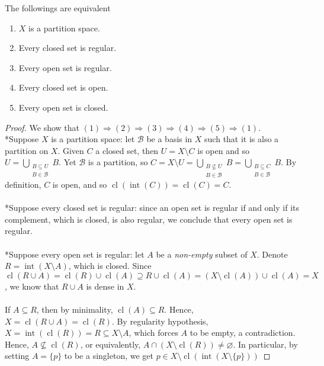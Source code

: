 \documentclass{treatise}
\begin{document}
\begin{theorem}
The followings are equivalent
\begin{enumerate}
    \item $X$ is a partition space.
    \item Every closed set is regular.
    \item Every open set is regular.
    \item Every closed set is open.
    \item Every open set is closed.
\end{enumerate}
\end{theorem}
\begin{proof}
We show that $(1) \Rightarrow (2) \Rightarrow (3) \Rightarrow (4) \Rightarrow (5) \Rightarrow (1)$.
\\
*Suppose $X$ is a partition space: let $\mathcal{B}$ be a basis in $X$ such that it is also a partition on $X$. Given $C$ a closed set, then $U = X \setminus C$ is open and so $U = \bigcup_{\substack{B \subseteq U \\ B \in \mathcal{B}}} B$. Yet $\mathcal{B}$ is a partition, so $C = X \setminus U = \bigcup_{\substack{B \not\subseteq U \\ B \in \mathcal{B}}} B = \bigcup_{\substack{B \subseteq C \\ B \in \mathcal{B}}} B$. By definition, $C$ is open, and so $\operatorname{cl}(\operatorname{int}(C)) = \operatorname{cl}(C) = C$.
\\
\\
*Suppose every closed set is regular: since an open set is regular if and only if its complement, which is closed, is also regular, we conclude that every open set is regular.
\\
\\
*Suppose every open set is regular: let $A$ be a \textit{non-empty} subset of $X$. Denote $R = \operatorname{int}(X \setminus A)$, which is closed. Since $\operatorname{cl}(R \cup A) = \operatorname{cl}(R) \cup \operatorname{cl}(A) \supseteq R \cup \operatorname{cl}(A) = (X \setminus \operatorname{cl}(A)) \cup \operatorname{cl}(A) = X$, we know that $R \cup A$ is dense in $X$.
\\
\\
If $A \subseteq R$, then by minimality, $\operatorname{cl}(A) \subseteq R$. Hence, $X = \operatorname{cl}(R \cup A) = \operatorname{cl}(R)$. By regularity hypothesis, $X = \operatorname{int}(\operatorname{cl}(R)) = R \subseteq X \setminus A$, which forces $A$ to be empty, a contradiction. Hence, $A \not\subseteq \operatorname{cl}(R)$, or equivalently, $A \cap (X \setminus \operatorname{cl}(R)) \neq \varnothing$. In particular, by setting $A = \{ p \}$ to be a singleton, we get $p \in X \setminus \operatorname{cl}(\operatorname{int}(X \setminus \{ p \}))$

\end{proof}
\end{document}
